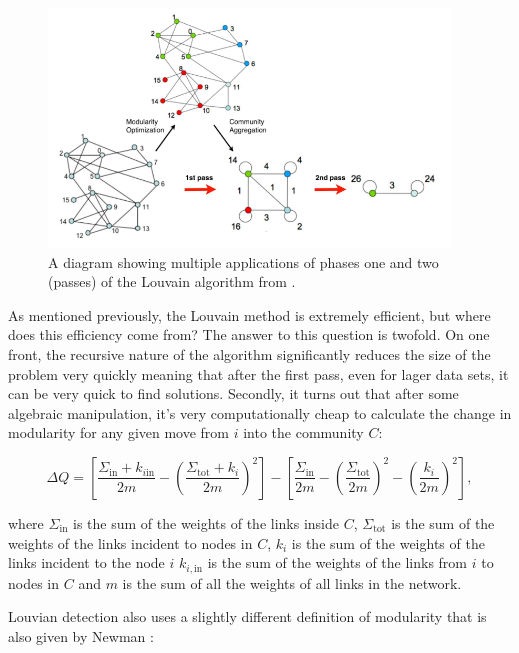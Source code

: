 \begin{figure}
    \begin{center}
        \includegraphics[width=0.95\textwidth]{img/3/louvain}
    \end{center}
    \caption{A diagram showing multiple applications of phases one and two (passes) of the Louvain algorithm from \cite{Blondel_2008}.}
    \label{fig:louvain_aggregation_diagram}
\end{figure}

As mentioned previously, the Louvain method is extremely efficient, but where does this efficiency come from? The answer to this question is twofold. On one front, the recursive nature of the algorithm significantly reduces the size of the problem very quickly meaning that after the first pass, even for lager data sets, it can be very quick to find solutions. Secondly, it turns out that after some algebraic manipulation, it's very computationally cheap to calculate the change in modularity for any given move from $i$ into the community $C$:

$$ \Delta Q = \left [\frac{\Sigma_{\text{in}} + k_{i \text{in}}}{2m} - \left (\frac{\Sigma_{\text{tot}} + k_i}{2m} \right )^2 \right ] - \left [ \frac{\Sigma_{\text{in}}}{2m} - \left ( \frac{\Sigma_{\text{tot}}}{2m} \right )^2 - \left ( \frac{k_i}{2m} \right )^2\right ], $$

\noindent
where $\Sigma_{\text{in}}$ is the sum of the weights of the links inside $C$, $\Sigma_{\text{tot}}$ is the sum of the weights of the links incident to nodes in $C$, $k_i$ is the sum of the weights of the links incident to the node $i$ $k_{i, \text{in}}$ is the sum of the weights of the links from $i$ to nodes in $C$ and $m$ is the sum of all the weights of all links in the network.

Louvian detection also uses a slightly different definition of modularity that is also given by Newman \cite{PhysRevE.70.056131}:

